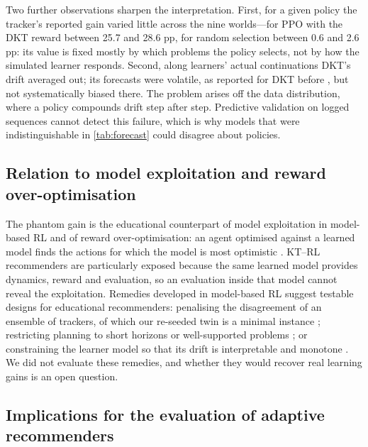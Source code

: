\documentclass[a4paper,preprint,12pt,authoryear]{elsarticle}
\begin{document}
Two further observations sharpen the interpretation. First, for a given policy the tracker's reported gain varied little across the nine worlds---for PPO with the DKT reward between 25.7 and 28.6 pp, for random selection between 0.6 and 2.6 pp: its value is fixed mostly by which problems the policy selects, not by how the simulated learner responds. Second, along learners' actual continuations DKT's drift averaged out; its forecasts were volatile, as reported for DKT before \citep{yeung2018dktplus}, but not systematically biased there. The problem arises off the data distribution, where a policy compounds drift step after step. Predictive validation on logged sequences cannot detect this failure, which is why models that were indistinguishable in \cref{tab:forecast} could disagree about policies.

\subsection{Relation to model exploitation and reward over-optimisation}

The phantom gain is the educational counterpart of model exploitation in model-based RL and of reward over-optimisation: an agent optimised against a learned model finds the actions for which the model is most optimistic \citep{kurutach2018metrpo,janner2019trust,gao2023scaling,skalse2022reward}. KT--RL recommenders are particularly exposed because the same learned model provides dynamics, reward and evaluation, so an evaluation inside that model cannot reveal the exploitation. Remedies developed in model-based RL suggest testable designs for educational recommenders: penalising the disagreement of an ensemble of trackers, of which our re-seeded twin is a minimal instance \citep{kurutach2018metrpo,yu2020mopo}; restricting planning to short horizons or well-supported problems \citep{janner2019trust}; or constraining the learner model so that its drift is interpretable and monotone \citep{zhang2023cmkt}. We did not evaluate these remedies, and whether they would recover real learning gains is an open question.

\subsection{Implications for the evaluation of adaptive recommenders}
\end{document}
